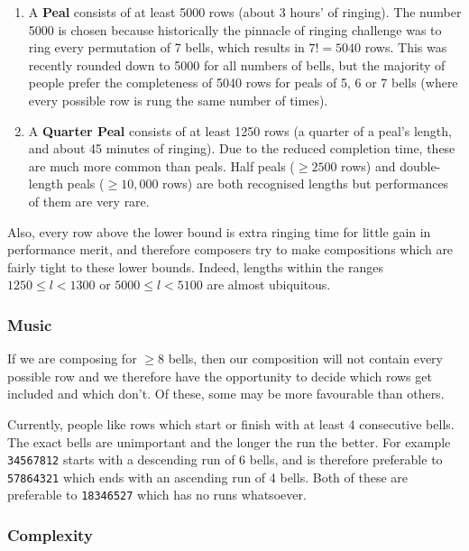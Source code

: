 \documentclass[12pt]{article}
\newcommand{\row}[1]{\texttt{#1}}
\begin{document}
\begin{enumerate}
    \item A \textbf{Peal} consists of at least 5000 rows (about 3 hours' of ringing).
        The number 5000 is chosen because historically the pinnacle of ringing challenge was to ring
        every permutation of 7 bells, which results in $7! = 5040$ rows.  This was recently rounded
        down to 5000 for all numbers of bells, but the majority of people prefer the completeness of
        5040 rows for peals of 5, 6 or 7 bells (where every possible row is rung the same number of
        times).
    \item A \textbf{Quarter Peal} consists of at least 1250 rows (a quarter of a peal's length, and
        about 45 minutes of ringing).  Due to the reduced completion time, these are much more
        common than peals.  Half peals ($\ge 2500$ rows) and double-length peals ($\ge 10,000$ rows)
        are both recognised lengths but performances of them are very rare.
\end{enumerate}

Also, every row above the lower bound is extra ringing time for little gain in performance merit,
and therefore composers try to make compositions which are fairly tight to these lower bounds.
Indeed, lengths within the ranges $1250 \le l < 1300$ or $5000 \le l < 5100$ are almost ubiquitous.

\subsubsection{Music}

If we are composing for $\ge 8$ bells, then our composition will not contain every possible row and
we therefore have the opportunity to decide which rows get included and which don't.  Of these, some
may be more favourable than others.

Currently, people like rows which start or finish with at least 4 consecutive bells.  The exact bells
are unimportant and the longer the run the better.  For example \row{34567812} starts with a
descending run of 6 bells, and is therefore preferable to \row{57864321} which ends with an
ascending run of 4 bells.  Both of these are preferable to \row{18346527} which has no runs
whatsoever.

\subsubsection{Complexity}
\end{document}
